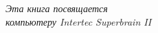 \begin{titlepage}
\vspace*{\fill}

\begin{flushright}
\emph{Эта книга посвящается \\
компьютеру Intertec Superbrain II}
\end{flushright}

\vspace*{\fill}
\end{titlepage}

